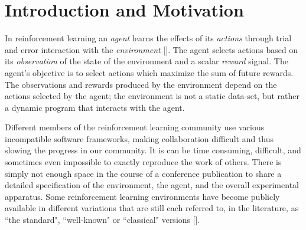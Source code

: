 \documentclass[twopage,11pt]{article}
\begin{document}
\section{Introduction and Motivation}
In reinforcement learning an {\it agent} learns the effects of its {\it actions} through trial and error interaction with the {\it environment} [\cite{rlbook, rlsurvey,ndp}]. The agent selects actions based on its {\it observation} of the state of the environment and a scalar {\it reward} signal. The agent's objective is to select actions which maximize the sum of future rewards. The observations and rewards produced by the environment depend on the actions selected by the agent; the environment is not a static data-set, but rather a dynamic program that interacts with the agent.
 


Different members of the reinforcement learning community use various incompatible software frameworks, making collaboration difficult and thus slowing the progress in our community. It is can be time consuming, difficult, and sometimes even impossible to exactly reproduce the work of others.  There is simply not enough space in the course of a conference publication to share a detailed specification of the environment, the agent, and the overall experimental apparatus.
Some reinforcement learning environments have become publicly available in different variations that are still each referred to, in the literature, as ``the standard", ``well-known" or ``classical"  versions [\cite{whiteThesis}]. %



\end{document}
